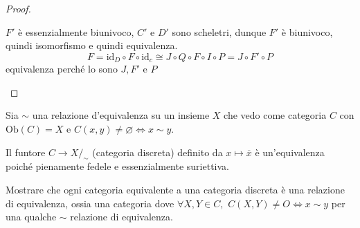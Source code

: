 \begin{proof}
\begin{itemize}
    \(F'\) è essenzialmente biunivoco, \(C'\) e \(D'\) sono scheletri, dunque \(F'\) è biunivoco, quindi isomorfismo e quindi equivalenza.
    \[
        F = \mathrm{id}_D \circ F \circ \mathrm{id}_c \cong J \circ Q \circ F
        \circ I \circ P = J \circ F' \circ P
    \]
    equivalenza perché lo sono \(J, F'\) e \(P\) 
\end{itemize}
\end{proof}

\begin{example}{}
    Sia \(\sim \) una relazione d'equivalenza su un insieme \(X\) che vedo come
    categoria \(C\) con \(\mathrm{Ob}{(C)} = X\)  e \(C{(x,y)} \neq \varnothing \iff x \sim y\).

    Il funtore \(C \to X/_\sim\) (categoria discreta) definito da \(x \mapsto
    \overline{x}\) è un'equivalenza poiché pienamente fedele e essenzialmente
    suriettiva.
\end{example}

\begin{eser}{}
    Mostrare che ogni categoria equivalente a una categoria discreta è una relazione di
    equivalenza, ossia una categoria dove \(\forall X, Y \in C, \,\,
    C{(X,Y)} \neq O \iff x \sim y \) per una qualche \(\sim \) relazione di
    equivalenza.
\end{eser}


